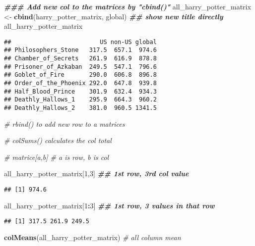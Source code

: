 \documentclass[
]{article}
\newenvironment{Shaded}{\begin{snugshade}}{\end{snugshade}}
\newcommand{\CommentTok}[1]{\textcolor[rgb]{0.56,0.35,0.01}{\textit{#1}}}
\newcommand{\DecValTok}[1]{\textcolor[rgb]{0.00,0.00,0.81}{#1}}
\newcommand{\DocumentationTok}[1]{\textcolor[rgb]{0.56,0.35,0.01}{\textbf{\textit{#1}}}}
\newcommand{\FunctionTok}[1]{\textcolor[rgb]{0.13,0.29,0.53}{\textbf{#1}}}
\newcommand{\NormalTok}[1]{#1}
\newcommand{\OtherTok}[1]{\textcolor[rgb]{0.56,0.35,0.01}{#1}}
\newcommand{\SpecialCharTok}[1]{\textcolor[rgb]{0.81,0.36,0.00}{\textbf{#1}}}
\begin{document}
\begin{Shaded}
\begin{Highlighting}[]
\DocumentationTok{\#\#\# Add new col to the matrices by "cbind()" }
\NormalTok{all\_harry\_potter\_matrix }\OtherTok{\textless{}{-}} \FunctionTok{cbind}\NormalTok{(harry\_potter\_matrix, global) }\DocumentationTok{\#\# show new title directly}
\NormalTok{all\_harry\_potter\_matrix}
\end{Highlighting}
\end{Shaded}

\begin{verbatim}
##                         US non-US global
## Philosophers_Stone   317.5  657.1  974.6
## Chamber_of_Secrets   261.9  616.9  878.8
## Prisoner_of_Azkaban  249.5  547.1  796.6
## Goblet_of_Fire       290.0  606.8  896.8
## Order_of_the_Phoenix 292.0  647.8  939.8
## Half_Blood_Prince    301.9  632.4  934.3
## Deathly_Hallows_1    295.9  664.3  960.2
## Deathly_Hallows_2    381.0  960.5 1341.5
\end{verbatim}

\begin{Shaded}
\begin{Highlighting}[]
\CommentTok{\# rbind() to add new row to a matrices}

\CommentTok{\# colSums() calculates the col total}

\CommentTok{\# matrice[a,b] \# a is row, b is col}

\NormalTok{all\_harry\_potter\_matrix[}\DecValTok{1}\NormalTok{,}\DecValTok{3}\NormalTok{] }\DocumentationTok{\#\# 1st row, 3rd col value}
\end{Highlighting}
\end{Shaded}

\begin{verbatim}
## [1] 974.6
\end{verbatim}

\begin{Shaded}
\begin{Highlighting}[]
\NormalTok{all\_harry\_potter\_matrix[}\DecValTok{1}\SpecialCharTok{:}\DecValTok{3}\NormalTok{] }\DocumentationTok{\#\# 1st row, 3 values in that row}
\end{Highlighting}
\end{Shaded}

\begin{verbatim}
## [1] 317.5 261.9 249.5
\end{verbatim}

\begin{Shaded}
\begin{Highlighting}[]
\FunctionTok{colMeans}\NormalTok{(all\_harry\_potter\_matrix) }\CommentTok{\# all column mean}
\end{Highlighting}
\end{Shaded}
\end{document}
